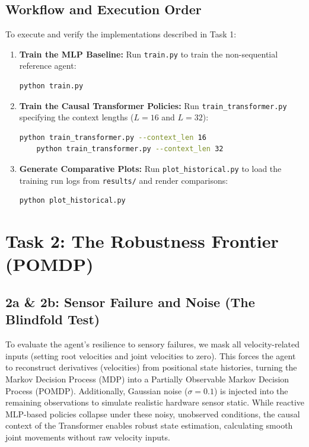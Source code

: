 \documentclass[11pt,a4paper]{article}
\begin{document}
\subsection{Workflow and Execution Order}
To execute and verify the implementations described in Task 1:
\begin{enumerate}
    \item \textbf{Train the MLP Baseline:} Run \texttt{train.py} to train the non-sequential reference agent:
    \begin{lstlisting}[language=bash]
    python train.py
    \end{lstlisting}
    \item \textbf{Train the Causal Transformer Policies:} Run \texttt{train\_transformer.py} specifying the context lengths ($L=16$ and $L=32$):
    \begin{lstlisting}[language=bash]
    python train_transformer.py --context_len 16
    python train_transformer.py --context_len 32
    \end{lstlisting}
    \item \textbf{Generate Comparative Plots:} Run \texttt{plot\_historical.py} to load the training run logs from \texttt{results/} and render comparisons:
    \begin{lstlisting}[language=bash]
    python plot_historical.py
    \end{lstlisting}
\end{enumerate}

\newpage

\section{Task 2: The Robustness Frontier (POMDP)}

\subsection{2a \& 2b: Sensor Failure and Noise (The Blindfold Test)}
To evaluate the agent's resilience to sensory failures, we mask all velocity-related inputs (setting root velocities and joint velocities to zero). This forces the agent to reconstruct derivatives (velocities) from positional state histories, turning the Markov Decision Process (MDP) into a Partially Observable Markov Decision Process (POMDP). Additionally, Gaussian noise ($\sigma = 0.1$) is injected into the remaining observations to simulate realistic hardware sensor static. While reactive MLP-based policies collapse under these noisy, unobserved conditions, the causal context of the Transformer enables robust state estimation, calculating smooth joint movements without raw velocity inputs.
\end{document}
